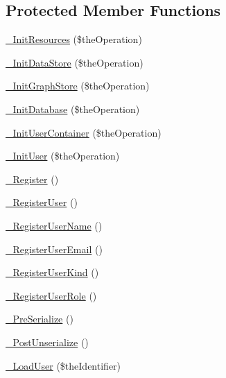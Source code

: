 \subsection*{Protected Member Functions}
\begin{DoxyCompactItemize}
\item 
\hyperlink{class_c_session_object_ad2a3c7f0c73f211b931d80430164fa22}{\-\_\-\-Init\-Resources} (\$the\-Operation)
\item 
\hyperlink{class_c_session_object_adf0b60bc1ab46ff8b5474c43f03f604d}{\-\_\-\-Init\-Data\-Store} (\$the\-Operation)
\item 
\hyperlink{class_c_session_object_a2c47162b8582c5b2e6b29790254b9506}{\-\_\-\-Init\-Graph\-Store} (\$the\-Operation)
\item 
\hyperlink{class_c_session_object_ab09b6b1dfb64b6cc33d86755a7682978}{\-\_\-\-Init\-Database} (\$the\-Operation)
\item 
\hyperlink{class_c_session_object_aeeef60870f814ab5e684f31b0b355f50}{\-\_\-\-Init\-User\-Container} (\$the\-Operation)
\item 
\hyperlink{class_c_session_object_a532d551552ca1c2e455d372f1fa874b9}{\-\_\-\-Init\-User} (\$the\-Operation)
\item 
\hyperlink{class_c_session_object_a8475f37a5fe74bc8816f3052cdd5e385}{\-\_\-\-Register} ()
\item 
\hyperlink{class_c_session_object_aee66e1fcbc50a1725238fa7163832ba5}{\-\_\-\-Register\-User} ()
\item 
\hyperlink{class_c_session_object_a8d30ae5bd8da0b37467c432e1111822c}{\-\_\-\-Register\-User\-Name} ()
\item 
\hyperlink{class_c_session_object_ac6f9750f5a98554e9dcb2c3abf59ac62}{\-\_\-\-Register\-User\-Email} ()
\item 
\hyperlink{class_c_session_object_ae8097e8b27bb29231c618633aa9dae4d}{\-\_\-\-Register\-User\-Kind} ()
\item 
\hyperlink{class_c_session_object_addcb474d86693415d229f9c3747df157}{\-\_\-\-Register\-User\-Role} ()
\item 
\hyperlink{class_c_session_object_ade51b12649217abf5464c25bea784985}{\-\_\-\-Pre\-Serialize} ()
\item 
\hyperlink{class_c_session_object_a4df4ee96badecc59ecdfb8f59a06e09a}{\-\_\-\-Post\-Unserialize} ()
\item 
\hyperlink{class_c_session_object_a2fd936580b9d8f0cecc22755726b8811}{\-\_\-\-Load\-User} (\$the\-Identifier)
\end{DoxyCompactItemize}
